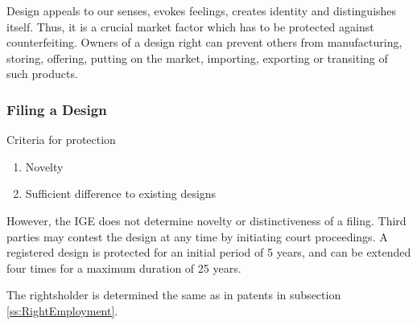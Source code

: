 \documentclass[11pt]{article}
\theoremstyle{definition}
\begin{document}
Design appeals to our senses, evokes feelings, creates identity and distinguishes itself. Thus, it is a crucial market factor which has to be protected against counterfeiting. Owners of a design right can prevent others from manufacturing, storing, offering, putting on the market, importing, exporting or transiting of such products.

\subsubsection{Filing a Design}
Criteria for protection
\begin{enumerate}
	\item Novelty
	\item Sufficient difference to existing designs
\end{enumerate}
However, the IGE does not determine novelty or distinctiveness of a filing. Third parties may contest the design at any time by initiating court proceedings. A registered design is protected for an initial period of 5 years, and can be extended four times for a maximum duration of 25 years.

The rightsholder is determined the same as in patents in subsection \ref{ss:RightEmployment}.
\end{document}
